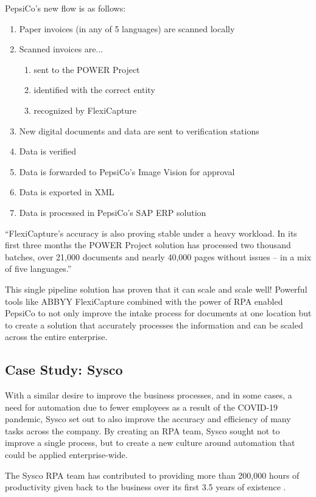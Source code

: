 \documentclass[conference, draftcls]{IEEEtran}
\begin{document}
PepsiCo's new flow is as follows:
\begin{enumerate}
\item Paper invoices (in any of 5 languages) are scanned locally
\item Scanned invoices are...
    \begin{enumerate}
        \item sent to the POWER Project
        \item identified with the correct entity
        \item recognized by FlexiCapture
    \end{enumerate}
\item New digital documents and data are sent to verification stations
\item Data is verified
\item Data is forwarded to PepsiCo's Image Vision for approval
\item Data is exported in XML
\item Data is processed in PepsiCo's SAP ERP solution
\end{enumerate}

``FlexiCapture's accuracy is also proving stable under a heavy workload. In its first three months the POWER Project solution has processed two thousand batches, over 21,000 documents and nearly 40,000 pages without issues – in a mix of five languages.'' \cite{pepsico}

This single pipeline solution has proven that it can scale and scale well! Powerful tools like ABBYY FlexiCapture combined with the power of RPA enabled PepsiCo to not only improve the intake process for documents at one location but to create a solution that accurately processes the information and can be scaled across the entire enterprise.

\subsection{Case Study: Sysco}
With a similar desire to improve the business processes, and in some cases, a need for automation due to fewer employees as a result of the COVID-19 pandemic, Sysco set out to also improve the accuracy and efficiency of many tasks across the company. By creating an RPA team, Sysco sought not to improve a single process, but to create a new culture around automation that could be applied enterprise-wide.

The Sysco RPA team has contributed to providing more than 200,000 hours of productivity given back to the business over its first 3.5 years of existence \cite{bpcafe2021sysco:slides}.
\end{document}
